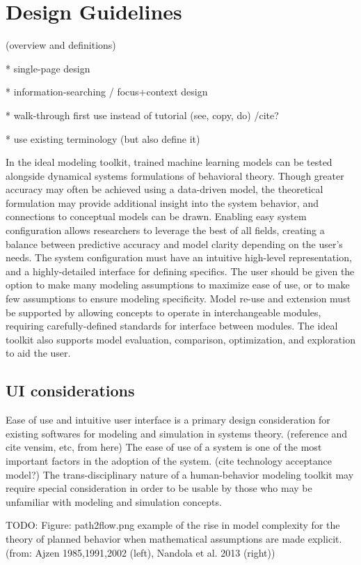\section{Design Guidelines}
(overview and definitions)

* single-page design

* information-searching / focus+context design

* walk-through first use instead of tutorial (see, copy, do) /cite{?}

* use existing terminology (but also define it)

In the ideal modeling toolkit, trained machine learning models can be tested alongside dynamical systems formulations of behavioral theory. 
Though greater accuracy may often be achieved using a data-driven model, the theoretical formulation may provide additional insight into the system behavior, and connections to conceptual models can be drawn. 
Enabling easy system configuration allows researchers to leverage the best of all fields, creating a balance between predictive accuracy and model clarity depending on the user’s needs. 
The system configuration must have an intuitive high-level representation, and a highly-detailed interface for defining specifics. 
The user should be given the option to make many modeling assumptions to maximize ease of use, or to make few assumptions to ensure modeling specificity. 
Model re-use and extension must be supported by allowing concepts to operate in interchangeable modules, requiring carefully-defined standards for interface between modules. 
The ideal toolkit also supports model evaluation, comparison, optimization, and exploration to aid the user.

\subsection{UI considerations}
Ease of use and intuitive user interface is a primary design consideration for existing softwares for modeling and simulation in systems theory. (reference and cite vensim, etc, from here) 
The ease of use of a system is one of the most important factors in the adoption of the system. (cite technology acceptance model?) 
The trans-disciplinary nature of a human-behavior modeling toolkit may require special consideration in order to be usable by those who may be unfamiliar with modeling and simulation concepts.

TODO: Figure: path2flow.png example of the rise in model complexity for the theory of planned behavior when mathematical assumptions are made explicit. (from: Ajzen 1985,1991,2002 (left), Nandola et al. 2013 (right))
